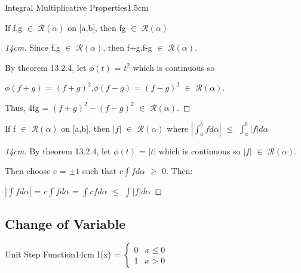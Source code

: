     \begin{ltheorem}{Integral Multiplicative Properties}{1.5cm}
        \item If f,g $\in$ $\mathscr{R}(\alpha)$ on [a,b], then
        fg $\in$ $\mathscr{R}(\alpha)$
    
            \begin{proof}[14cm]
                Since f,g $\in$ $\mathscr{R}(\alpha)$, then
                f+g,f-g $\in$ $\mathscr{R}(\alpha)$.

                By {\color{red} theorem 13.2.4}, let
                $\phi(t)$ = $t^2$ which is continuous so

                $\phi(f+g)$ = $(f+g)^2$,$\phi(f-g)$ = $(f-g)^2$ $\in$
                $\mathscr{R}(\alpha)$.

                Thus, 4fg = $(f+g)^2 - (f-g)^2$ $\in$ $\mathscr{R}(\alpha)$.                
            \end{proof}

        \item If f $\in$ $\mathscr{R}(\alpha)$ on [a,b], then
        $|f|$ $\in$ $\mathscr{R}(\alpha)$ where
        $|\int_a^b f d\alpha|$ $\leq$ $\int_a^b |f| d\alpha$

            \begin{proof}[14cm]
                By {\color{red} theorem 13.2.4}, let
                $\phi(t)$ = $|t|$ which is continuous so $|f|$ $\in$
                $\mathscr{R}(\alpha)$.

                Then choose c = $\pm 1$ such that $c \int f d\alpha$ $\geq$ 0. Then:

                \hspace{0.5cm}
                $|\int f d\alpha|$
                = $c \int f d\alpha$
                = $\int cf d\alpha$
                $\leq$ $\int |f| d\alpha$
            \end{proof}    
    \end{ltheorem}

    \vspace{0.5cm}





\subsection{ Change of Variable }

    \begin{definition}{Unit Step Function}{14cm}
        I(x) =
        $
        \begin{cases}
            0 & x \leq 0 \\
            1 & x > 0
        \end{cases}
        $
    \end{definition}

